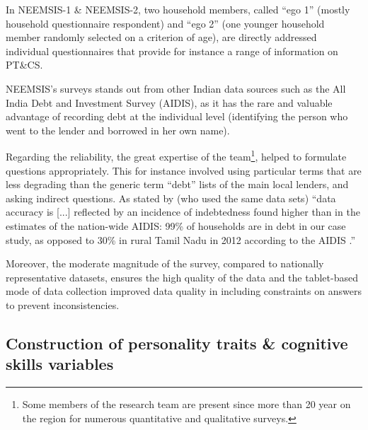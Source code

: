 \documentclass[a4paper, 11pt, onecolumn]{article}
\newcommand{\PTCS}{PT\&CS}
\begin{document}
In NEEMSIS-1 \& NEEMSIS-2, two household members, called ``ego 1'' (mostly household questionnaire respondent) and ``ego 2'' (one younger household member randomly selected on a criterion of age), are directly addressed individual questionnaires that provide for instance a range of information on \PTCS.

NEEMSIS's surveys stands out from other Indian data sources such as the All India Debt and Investment Survey (AIDIS), as it has the rare and valuable advantage of recording debt at the individual level (identifying the person who went to the lender and borrowed in her own name).

Regarding the reliability, the great expertise of the team\footnote{Some members of the research team are present since more than 20 year on the region for numerous quantitative and qualitative surveys.}, helped to formulate questions appropriately.
This for instance involved using particular terms that are less degrading than the generic term ``debt'' lists of the main local lenders, and asking indirect questions.
As stated by \cite{Reboul2021} (who used the same data sets) ``data accuracy is [...] reflected by an incidence of indebtedness found higher than in the estimates of the nation-wide AIDIS: 99\% of households are in debt in our case study, as opposed to 30\% in rural Tamil Nadu in 2012 according to the AIDIS \citep{NSSO2014}.'' 

Moreover, the moderate magnitude of the survey, compared to nationally representative datasets, ensures the high quality of the data and the tablet-based mode of data collection improved data quality in including constraints on answers to prevent inconsistencies. 




	\subsection{Construction of personality traits \& cognitive skills variables }
\end{document}
